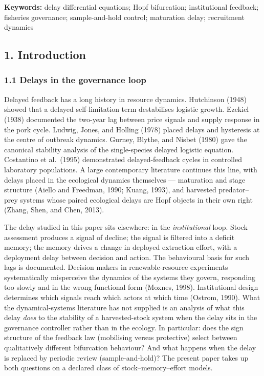 \documentclass[11pt]{article}
\begin{document}
\textbf{Keywords:} delay differential equations; Hopf bifurcation;
institutional feedback; fisheries governance; sample-and-hold control;
maturation delay; recruitment dynamics

\subsection{1. Introduction}\label{introduction}

\subsubsection{1.1 Delays in the governance
loop}\label{delays-in-the-governance-loop}

Delayed feedback has a long history in resource dynamics. Hutchinson
(1948) showed that a delayed self-limitation term destabilises logistic
growth. Ezekiel (1938) documented the two-year lag between price signals
and supply response in the pork cycle. Ludwig, Jones, and Holling (1978)
placed delays and hysteresis at the centre of outbreak dynamics. Gurney,
Blythe, and Nisbet (1980) gave the canonical stability analysis of the
single-species delayed logistic equation. Costantino et al.~(1995)
demonstrated delayed-feedback cycles in controlled laboratory
populations. A large contemporary literature continues this line, with
delays placed in the ecological dynamics themselves --- maturation and
stage structure (Aiello and Freedman, 1990; Kuang, 1993), and harvested
predator--prey systems whose paired ecological delays are Hopf objects
in their own right (Zhang, Shen, and Chen, 2013).

The delay studied in this paper sits elsewhere: in the
\emph{institutional} loop. Stock assessment produces a signal of
decline; the signal is filtered into a deficit memory; the memory drives
a change in deployed extraction effort, with a deployment delay between
decision and action. The behavioural basis for such lags is documented.
Decision makers in renewable-resource experiments systematically
misperceive the dynamics of the systems they govern, responding too
slowly and in the wrong functional form (Moxnes, 1998). Institutional
design determines which signals reach which actors at which time
(Ostrom, 1990). What the dynamical-systems literature has not supplied
is an analysis of what this delay \emph{does} to the stability of a
harvested-stock system when the delay sits in the governance controller
rather than in the ecology. In particular: does the sign structure of
the feedback law (mobilising versus protective) select between
qualitatively different bifurcation behaviour? And what happens when the
delay is replaced by periodic review (sample-and-hold)? The present
paper takes up both questions on a declared class of
stock--memory--effort models.
\end{document}
